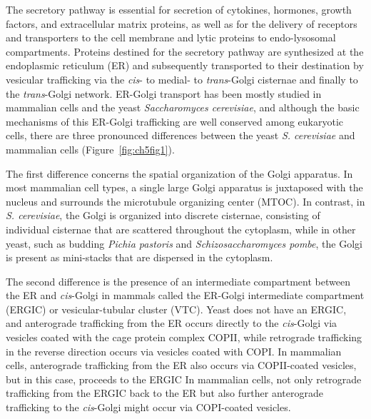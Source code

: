 The secretory pathway is essential for secretion of cytokines, hormones, growth factors, and extracellular matrix proteins, as well as for the delivery of receptors and transporters to the cell membrane and lytic proteins to endo-lysosomal compartments. Proteins destined for the secretory pathway are synthesized at the endoplasmic reticulum (ER) and subsequently transported to their destination by vesicular trafficking via the \emph{cis}- to medial- to \emph{trans}-Golgi cisternae and finally to the \emph{trans}-Golgi network\cite{puthenveedu_subcompartmentalizing_2005,cottam_retrograde_2012,malsam_organization_2011}. ER-Golgi transport has been mostly studied in mammalian cells and the yeast \emph{Saccharomyces cerevisiae}, and although the basic mechanisms of this ER-Golgi trafficking are well conserved among eukaryotic cells, there are three pronounced differences between the yeast \emph{S. cerevisiae} and mammalian cells (Figure~\ref{fig:ch5fig1}).

The first difference concerns the spatial organization of the Golgi apparatus. In most mammalian cell types, a single large Golgi apparatus is juxtaposed with the nucleus and surrounds the microtubule organizing center (MTOC)\cite{cottam_retrograde_2012,papanikou_yeast_2009,jackson_mechanisms_2009}. In contrast, in \emph{S. cerevisiae}, the Golgi is organized into discrete cisternae, consisting of individual cisternae that are scattered throughout the cytoplasm, while in other yeast, such as budding \emph{Pichia pastoris} and \emph{Schizosaccharomyces pombe}, the Golgi is present as mini-stacks that are dispersed in the cytoplasm\cite{papanikou_yeast_2009,jackson_mechanisms_2009}.

The second difference is the presence of an intermediate compartment between the ER and \emph{cis}-Golgi in mammals called the ER-Golgi intermediate compartment (ERGIC) or vesicular-tubular cluster (VTC)\cite{rowe_role_1998}. Yeast does not have an ERGIC, and anterograde trafficking from the ER occurs directly to the \emph{cis}-Golgi\cite{barlowe_copii_1994} via vesicles coated with the cage protein complex COPII, while retrograde trafficking in the reverse direction occurs via vesicles coated with COPI\cite{cottam_retrograde_2012,papanikou_yeast_2009}. In mammalian cells, anterograde trafficking from the ER also occurs via COPII-coated vesicles, but in this case, proceeds to the ERGIC\cite{cottam_retrograde_2012,papanikou_yeast_2009,jackson_mechanisms_2009} In mammalian cells, not only retrograde trafficking from the ERGIC back to the ER but also further anterograde trafficking to the \emph{cis}-Golgi might occur via COPI-coated vesicles\cite{appenzeller-herzog_er-golgi_2006}.

